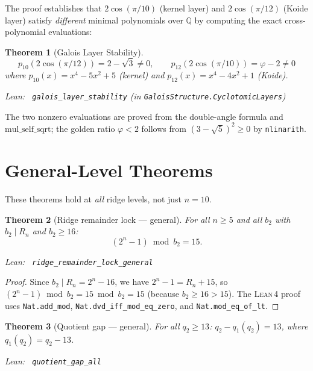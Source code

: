\documentclass[11pt,a4paper]{article}
\newenvironment{leanref}%
  {\par\smallskip\noindent\begingroup\raggedright\textup{Lean:}~}%
  {\par\endgroup}
\newtheorem{theorem}{Theorem}[section]
\theoremstyle{definition}
\newcommand{\Rn}{R_n}
\newcommand{\lean}{\textsc{Lean}\,4}
\begin{document}
The proof establishes that $2\cos(\pi/10)$ (kernel layer) and
$2\cos(\pi/12)$ (Koide layer) satisfy \emph{different} minimal polynomials
over $\mathbb{Q}$ by computing the exact cross-polynomial evaluations:

\begin{theorem}[Galois Layer Stability]\label{thm:galois}
\[
  p_{10}(2\cos(\pi/12)) = 2 - \sqrt{3} \ne 0, \qquad
  p_{12}(2\cos(\pi/10)) = \varphi - 2 \ne 0
\]
where $p_{10}(x) = x^4 - 5x^2 + 5$ (kernel) and $p_{12}(x) = x^4 - 4x^2 + 1$ (Koide).
\begin{leanref} \lstinline|galois_layer_stability|
\textup{(in \texttt{GaloisStructure.CyclotomicLayers})}
\end{leanref}
\end{theorem}

The two nonzero evaluations are proved from the double-angle formula and
$\mathrm{mul\_self\_sqrt}$; the golden ratio $\varphi < 2$ follows from
$(3 - \sqrt{5})^2 \ge 0$ by \texttt{nlinarith}.


\section{General-Level Theorems}\label{sec:general}

These theorems hold at \emph{all} ridge levels, not just $n = 10$.

\begin{theorem}[Ridge remainder lock --- general]\label{thm:rrl}
For all $n \ge 5$ and all $b_2$ with $b_2 \mid \Rn$ and $b_2 \ge 16$:
\[
  (2^n - 1) \bmod b_2 = 15.
\]

\begin{leanref} \lstinline|ridge_remainder_lock_general|
\end{leanref}
\end{theorem}

\begin{proof}
Since $b_2 \mid \Rn = 2^n - 16$, we have $2^n - 1 = \Rn + 15$, so
$(2^n - 1) \bmod b_2 = 15 \bmod b_2 = 15$ (because $b_2 \ge 16 > 15$).
The \lean{} proof uses \texttt{Nat.add\_mod}, \texttt{Nat.dvd\_iff\_mod\_eq\_zero},
and \texttt{Nat.mod\_eq\_of\_lt}.
\end{proof}

\begin{theorem}[Quotient gap --- general]\label{thm:gap13}
For all $q_2 \ge 13$:
$q_2 - q_1(q_2) = 13$,
where $q_1(q_2) = q_2 - 13$.

\begin{leanref} \lstinline|quotient_gap_all|
\end{leanref}
\end{theorem}
\end{document}
